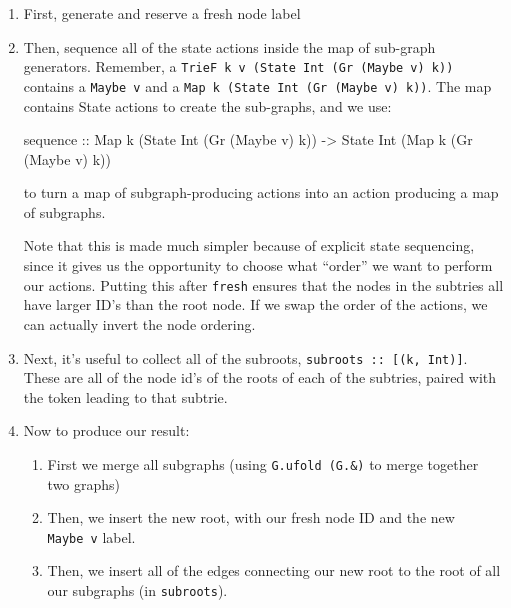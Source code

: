 \documentclass[]{article}
\newenvironment{Shaded}{}{}
\newcommand{\DataTypeTok}[1]{\textcolor[rgb]{0.56,0.13,0.00}{#1}}
\newcommand{\NormalTok}[1]{#1}
\newcommand{\OtherTok}[1]{\textcolor[rgb]{0.00,0.44,0.13}{#1}}
\begin{document}
\begin{enumerate}
\def\labelenumi{\arabic{enumi}.}
\item
  First, generate and reserve a fresh node label
\item
  Then, sequence all of the state actions inside the map of sub-graph
  generators. Remember, a
  \texttt{TrieF\ k\ v\ (State\ Int\ (Gr\ (Maybe\ v)\ k))} contains a
  \texttt{Maybe\ v} and a \texttt{Map\ k\ (State\ Int\ (Gr\ (Maybe\ v)\ k))}.
  The map contains State actions to create the sub-graphs, and we use:

\begin{Shaded}
\begin{Highlighting}[]
\NormalTok{sequence}
\OtherTok{    ::} \DataTypeTok{Map}\NormalTok{ k (}\DataTypeTok{State} \DataTypeTok{Int}\NormalTok{ (}\DataTypeTok{Gr}\NormalTok{ (}\DataTypeTok{Maybe}\NormalTok{ v) k))}
    \OtherTok{->} \DataTypeTok{State} \DataTypeTok{Int}\NormalTok{ (}\DataTypeTok{Map}\NormalTok{ k (}\DataTypeTok{Gr}\NormalTok{ (}\DataTypeTok{Maybe}\NormalTok{ v) k))}
\end{Highlighting}
\end{Shaded}

  to turn a map of subgraph-producing actions into an action producing a map of
  subgraphs.

  Note that this is made much simpler because of explicit state sequencing,
  since it gives us the opportunity to choose what ``order'' we want to perform
  our actions. Putting this after \texttt{fresh} ensures that the nodes in the
  subtries all have larger ID's than the root node. If we swap the order of the
  actions, we can actually invert the node ordering.
\item
  Next, it's useful to collect all of the subroots,
  \texttt{subroots\ ::\ {[}(k,\ Int){]}}. These are all of the node id's of the
  roots of each of the subtries, paired with the token leading to that subtrie.
\item
  Now to produce our result:

  \begin{enumerate}
  \def\labelenumii{\alph{enumii}.}
  \tightlist
  \item
    First we merge all subgraphs (using \texttt{G.ufold\ (G.\&)} to merge
    together two graphs)
  \item
    Then, we insert the new root, with our fresh node ID and the new
    \texttt{Maybe\ v} label.
  \item
    Then, we insert all of the edges connecting our new root to the root of all
    our subgraphs (in \texttt{subroots}).
  \end{enumerate}
\end{enumerate}
\end{document}
